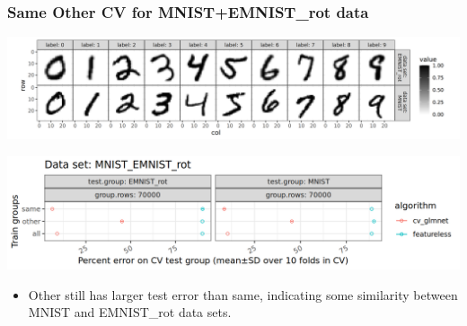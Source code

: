 \documentclass{beamer}
\begin{document}
\begin{frame}
  \frametitle{Same Other CV for MNIST+EMNIST\_rot data}

  \includegraphics[width=\textwidth]{data_Classif_MNIST_other_EMNIST_rot.png}
  
  \includegraphics[width=\textwidth]{MNIST_EMNIST_rot_error_glmnet_featureless_mean_SD.png}
  \begin{itemize}
  \item Other still has larger test error than same, indicating some
    similarity between MNIST and EMNIST\_rot data sets.
  \end{itemize}
\end{frame}
\end{document}
